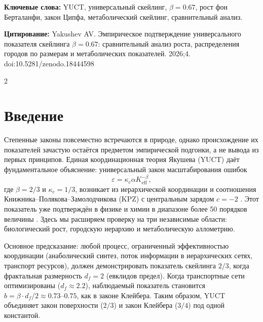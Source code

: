 \documentclass[11pt,a4paper]{article}
\newcommand{\eps}{\varepsilon}
\newcommand{\kappac}{\kappa_c}
\newcommand{\Keff}{K_{\mathrm{eff}}}
\newcommand{\betaf}{\beta}
\newcommand{\df}{d_f}
\begin{document}
	\vspace{0.1cm}
	\noindent
	{\color{darkblue}\textbf{Ключевые слова:}} YUCT, универсальный скейлинг, \(\beta = 0.67\), рост фон Берталанфи, закон Ципфа, метаболический скейлинг, сравнительный анализ.
	
	\vspace{0.1cm}
	\noindent
	{\color{darkblue}\textbf{Цитирование:}} Yakushev AV. Эмпирическое подтверждение универсального показателя скейлинга \(\beta = 0.67\): сравнительный анализ роста, распределения городов по размерам и метаболических показателей. 2026;4. doi:10.5281/zenodo.18444598
	
	\vspace{0.4cm}
	\vspace*{-\baselineskip}
	\begin{multicols}{2}
		
		\section{Введение}
		
		Степенные законы повсеместно встречаются в природе, однако происхождение их показателей зачастую остаётся предметом эмпирической подгонки, а не вывода из первых принципов. Единая координационная теория Якушева (YUCT) даёт фундаментальное объяснение: универсальный закон масштабирования ошибок
		\[
		\eps = \kappac \alpha \Keff^{-\betaf},
		\]
		где \(\betaf = 2/3\) и \(\kappac = 1/3\), возникает из иерархической координации и соотношения Книжника–Полякова–Замолодчикова (KPZ) с центральным зарядом \(c = -2\) \cite{AppendixY, AppendixL}. Этот показатель уже подтверждён в физике и химии в диапазоне более 50 порядков величины \cite{AppendixC, AppendixG}. Здесь мы расширяем проверку на три независимые области: биологический рост, городскую иерархию и метаболическую аллометрию.
		
		Основное предсказание: любой процесс, ограниченный эффективностью координации (анаболический синтез, поток информации в иерархических сетях, транспорт ресурсов), должен демонстрировать показатель скейлинга \(2/3\), когда фрактальная размерность \(\df = 2\) (евклидов предел). Когда транспортные сети оптимизированы (\(\df \approx 2.2\)), наблюдаемый показатель становится \(b = \betaf \cdot \df/2 \approx 0.73\)–\(0.75\), как в законе Клейбера. Таким образом, YUCT объединяет закон поверхности (\(2/3\)) и закон Клейбера (\(3/4\)) под одной константой.
		

\end{multicols}
\end{document}

